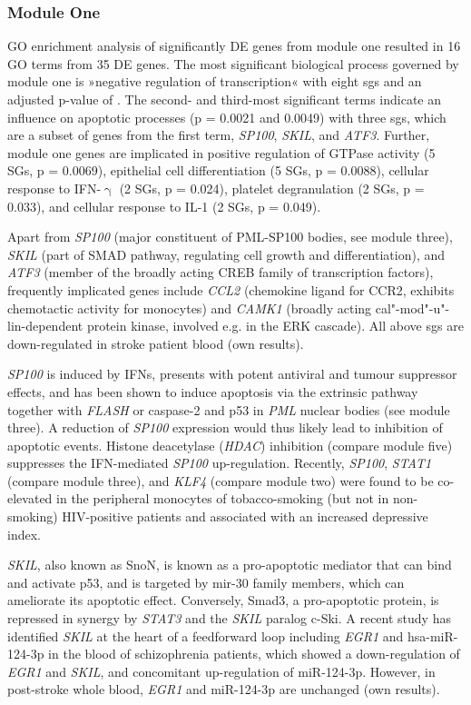 \subsubsection{Module One}
GO enrichment analysis of significantly DE genes from module one resulted in 16 GO terms from 35 DE genes. The most significant biological process governed by module one is »negative regulation of transcription« with eight \acp{sg} and an adjusted p-value of . The second- and third-most significant terms indicate an influence on apoptotic processes (p = 0.0021 and 0.0049) with three \acp{sg}, which are a subset of genes from the first term, \emph{SP100}, \emph{SKIL}, and \emph{ATF3}. Further, module one genes are implicated in positive regulation of GTPase activity (5 SGs, p = 0.0069), epithelial cell differentiation (5 SGs, p = 0.0088), cellular response to IFN-$\upgamma$ (2 SGs, p = 0.024), platelet degranulation (2 SGs, p = 0.033), and cellular response to IL-1 (2 SGs, p = 0.049).

Apart from \emph{SP100} (major constituent of PML-SP100 bodies, see module three), \emph{SKIL} (part of SMAD pathway, regulating cell growth and differentiation), and \emph{ATF3} (member of the broadly acting CREB family of transcription factors), frequently implicated genes include \emph{CCL2} (chemokine ligand for CCR2, exhibits chemotactic activity for monocytes\cite{Zhang1994}) and \emph{CAMK1} (broadly acting cal"-mod"-u"-lin-dependent protein kinase, involved e.g. in the ERK cascade). All above \acp{sg} are down-regulated in stroke patient blood (own results).

\emph{SP100} is induced by IFNs, presents with potent antiviral and tumour suppressor effects, and has been shown to induce apoptosis via the extrinsic pathway together with \emph{FLASH} or caspase-2 and p53 in \emph{PML} nuclear bodies (see module three).\cite{Sanchez-Pulido2007} A reduction of \emph{SP100} expression would thus likely lead to inhibition of apoptotic events. Histone deacetylase (\emph{HDAC}) inhibition (compare module five) suppresses the IFN-mediated \emph{SP100} up-regulation.\cite{Vlasakova2007} Recently, \emph{SP100}, \emph{STAT1} (compare module three), and \emph{KLF4} (compare module two) were found to be co-elevated in the peripheral monocytes of tobacco-smoking (but not in non-smoking) HIV-positive patients and associated with an increased depressive index.\cite{Lorenz2019}

\emph{SKIL}, also known as SnoN, is known as a pro-apoptotic mediator that can bind and activate p53, and is targeted by mir-30 family members, which can ameliorate its apoptotic effect.\cite{Kim2018} Conversely, Smad3, a pro-apoptotic protein, is repressed in synergy by \emph{STAT3} and the \emph{SKIL} paralog c-Ski.\cite{Makino2017} A recent study has identified \emph{SKIL} at the heart of a feedforward loop including \emph{EGR1} and hsa-miR-124-3p in the blood of schizophrenia patients, which showed a down-regulation of \emph{EGR1} and \emph{SKIL}, and concomitant up-regulation of miR-124-3p.\cite{Xu2016} However, in post-stroke whole blood, \emph{EGR1} and miR-124-3p are unchanged (own results).

